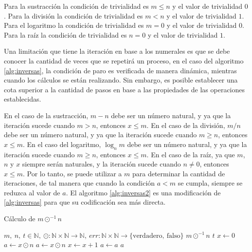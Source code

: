 Para la sustracción la condición de trivialidad es \( m \leq n \) y el valor de trivialidad \( 0 \). Para la división la condición de trivialidad es \( m < n \) y el valor de trivialidad \( 1 \). Para el logaritmo la condición de trivialidad es \( m=0 \) y el valor de trivialidad \( 0 \). Para la raíz la condición de trivialidad es \( n=0 \) y el valor de trivialidad \( 1 \).

Una limitación que tiene la iteración en base a los numerales es que se debe conocer la cantidad de veces que se repetirá un proceso, en el caso del algoritmo \ref{alg:inversas}, la condición de paro es verificada de manera dinámica, mientras cuando los cálculos se están realizando. Sin embargo, es posible establecer una cota superior a la cantidad de pasos en base a las propiedades de las operaciones establecidas.

En el caso de la sustracción, \( m-n \) debe ser un número natural, y ya que la iteración sucede cuando \( m>n \), entonces \( x\leq m \). En el caso de la división, \( m/n \) debe ser un número natural, y ya que la iteración sucede cuando \( m\geq n \), entonces \( x\leq m \). En el caso del logaritmo, \( \log_{n}m \) debe ser un número natural, y ya que la iteración sucede cuando \( m\geq n \), entonces \( x\leq m \). En el caso de la raíz, ya que \( m \), \( n \) y \( x \) siempre serán naturales, y la iteración sucede cuando \( n \not= 0 \), entonces \( x\leq m \). Por lo tanto, se puede utilizar a \( m \) para determinar la cantidad de iteraciones, de tal manera que cuando la condición \( a < m \) se cumpla, siempre se reduzca al valor de \( a \). El algoritmo \ref{alg:inversas2} es una modificación de \ref{alg:inversas} para que su codificación sea más directa.

\begin{algorithm}
  \caption{Cálculo de \( m \odot^{-1} n \)}
  \label{alg:inversas2}
  \begin{algorithmic}
    \REQUIRE \( m,\ n,\ t \in \mathbb{N},\ \odot \colon \mathbb{N} \times \mathbb{N} \to \mathbb{N},\ err \colon \mathbb{N} \times \mathbb{N} \to \{ \mathrm{verdadero},\ \mathrm{falso} \} \)
    \ENSURE \( m \odot^{-1} n \)
    \RETURN \( t \)
    \ELSE
    \STATE \( x \leftarrow 0 \)
    \STATE \( a \leftarrow x \odot n \)
    \STATE \( a \leftarrow x \odot n \)
    \STATE \( x \leftarrow x + 1 \)
    \ELSE
    \STATE \( a \leftarrow a \)
    \ENDIF
    \ENDFOR
    \RETURN \( a \)
    \ENDIF
  \end{algorithmic}
\end{algorithm}


